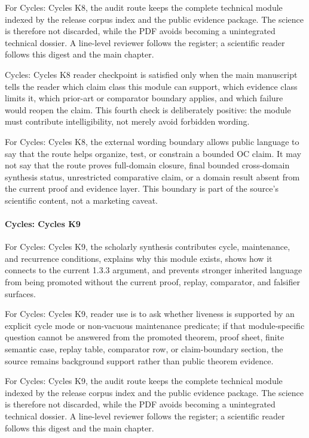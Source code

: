 For Cycles: Cycles K8, the audit route keeps the complete technical module indexed by the release corpus index and the public evidence package. The science is therefore not discarded, while the PDF avoids becoming a unintegrated technical dossier. A line-level reviewer follows the register; a scientific reader follows this digest and the main chapter.


Cycles: Cycles K8 reader checkpoint is satisfied only when the main manuscript tells the reader which claim class this module can support, which evidence class limits it, which prior-art or comparator boundary applies, and which failure would reopen the claim. This fourth check is deliberately positive: the module must contribute intelligibility, not merely avoid forbidden wording.


For Cycles: Cycles K8, the external wording boundary allows public language to say that the route helps organize, test, or constrain a bounded OC claim. It may not say that the route proves full-domain closure, final bounded cross-domain synthesis status, unrestricted comparative claim, or a domain result absent from the current proof and evidence layer. This boundary is part of the source's scientific content, not a marketing caveat.


\paragraph{Cycles: Cycles K9}

For Cycles: Cycles K9, the scholarly synthesis contributes cycle, maintenance, and recurrence conditions, explains why this module exists, shows how it connects to the current 1.3.3 argument, and prevents stronger inherited language from being promoted without the current proof, replay, comparator, and falsifier surfaces.


For Cycles: Cycles K9, reader use is to ask whether liveness is supported by an explicit cycle mode or non-vacuous maintenance predicate; if that module-specific question cannot be answered from the promoted theorem, proof sheet, finite semantic case, replay table, comparator row, or claim-boundary section, the source remains background support rather than public theorem evidence.


For Cycles: Cycles K9, the audit route keeps the complete technical module indexed by the release corpus index and the public evidence package. The science is therefore not discarded, while the PDF avoids becoming a unintegrated technical dossier. A line-level reviewer follows the register; a scientific reader follows this digest and the main chapter.


